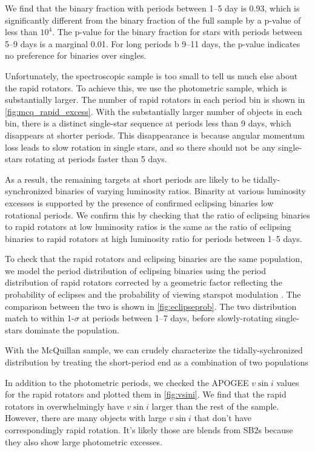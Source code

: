 \documentclass[manuscript]{aastex6}
\newcommand{\vsini}{\ensuremath{v \sin i}}
\newcommand{\gvs}{\authorcomment1}
\begin{document}
We find that the binary fraction with periods between 1--5 day is 0.93, which
is significantly different from the binary fraction of the full sample by a
p-value of less than \(10^4\). The p-value for the binary fraction for stars
with periods between 5--9 days is a marginal 0.01. For long periods b
9--11 days, the p-value indicates no preference for binaries over singles.

Unfortunately, the spectroscopic sample is too small to tell us much else about
the rapid rotators. To achieve this, we use the photometric sample, which is
substantially larger. The number of rapid rotators in each period bin is shown
in \cref{fig:mcq_rapid_excess}. With the substantially larger number of objects
in each bin, there is a distinct single-star sequence at
periods less than 9 days, which disappears at shorter periods. This
disappearance is because angular momentum loss leads to slow rotation in single
stars, and so there should not be any single-stars rotating at periods faster
than 5 days.

As a result, the remaining targets at short periods are likely to be
tidally-synchronized binaries of varying luminosity ratios. Binarity at various
luminosity excesses is supported by the presence of confirmed eclipsing
binaries low rotational periods. We confirm this by checking that the ratio of
eclipsing binaries to rapid rotators at low luminosity ratios is the same as
the ratio of eclipsing binaries to rapid rotators at high luminosity ratio for
periods between 1--5 days.

To check that the rapid rotators and eclipsing binaries are the same
population, we model the period distribution of eclipsing binaries using the 
period distribution of rapid rotators corrected by a geometric factor
reflecting the probability of eclipses \citep{Kirk16} and the probability of
viewing starspot modulation \citep{Jackson12}. The comparison between the two
is shown in \cref{fig:eclipseprob}. The two distribution match to within
1-\(\sigma\) at periods between 1--7 days, before slowly-rotating single-stars 
dominate the population.

\gvs{Maybe add some discussion about this\dots}
With the McQuillan sample, we can crudely characterize the tidally-sychronized
distribution by treating the short-period end as a combination of two
populations

In addition to the photometric periods, we checked the APOGEE \vsini{} values 
for the rapid rotators and plotted them in \cref{fig:vsini}. We find that the
rapid rotators in \citep{McQuillan14} overwhelmingly have \vsini{} larger than
the rest of the sample. However, there are many objects with large
\vsini{} that don't have correspondingly rapid rotation. It's likely those are
blends from SB2s because they also show large photometric excesses.
\end{document}
